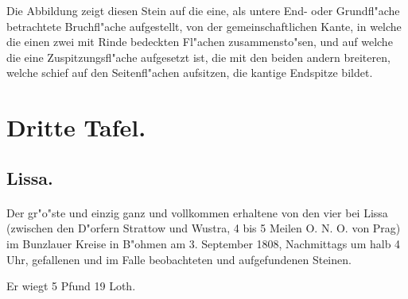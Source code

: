 \documentclass[a4paper, 11pt, oneside, german]{article}
\begin{document}
Die Abbildung zeigt diesen Stein auf die eine, als untere End- oder Grundfl"ache betrachtete Bruchfl"ache aufgestellt, von der gemeinschaftlichen Kante, in welche die einen zwei mit Rinde bedeckten Fl"achen zusammensto"sen, und auf welche die eine Zuspitzungsfl"ache aufgesetzt ist, die mit den beiden andern breiteren, welche schief auf den Seitenfl"achen aufsitzen, die kantige Endspitze bildet.
\clearpage
\section{Dritte Tafel.}
\subsection{Lissa.}
\paragraph{}
Der gr"o"ste und einzig ganz und vollkommen erhaltene von den vier bei Lissa (zwischen den D"orfern Strattow und Wustra, 4 bis 5 Meilen O. N. O. von Prag) im Bunzlauer Kreise in B"ohmen am 3. September 1808, Nachmittags um halb 4 Uhr, gefallenen und im Falle beobachteten und aufgefundenen Steinen.

Er wiegt 5 Pfund 19 Loth.
\end{document}
